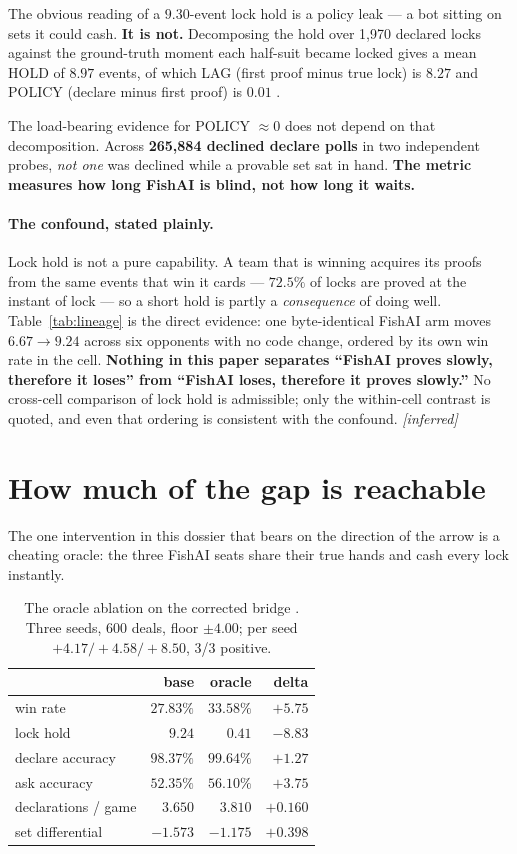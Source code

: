 \documentclass[11pt]{article}
\begin{document}
The obvious reading of a $9.30$-event lock hold is a policy leak --- a bot sitting on sets it could
cash. \textbf{It is not.} Decomposing the hold over 1{,}970 declared locks against the ground-truth
moment each half-suit became locked gives a mean HOLD of $8.97$ events, of which LAG (first proof
minus true lock) is $8.27$ and POLICY (declare minus first proof) is $\mathbf{0.01}$ \cite{loses}.

The load-bearing evidence for POLICY ${\approx}0$ does not depend on that decomposition. Across
\textbf{265{,}884 declined declare polls} in two independent probes, \emph{not one} was declined
while a provable set sat in hand. \textbf{The metric measures how long FishAI is blind, not how long
it waits.}

\paragraph{The confound, stated plainly.} Lock hold is not a pure capability. A team that is winning
acquires its proofs from the same events that win it cards --- $72.5\%$ of locks are proved at the
instant of lock --- so a short hold is partly a \emph{consequence} of doing well.
Table~\ref{tab:lineage} is the direct evidence: one byte-identical FishAI arm moves $6.67 \to 9.24$
across six opponents with no code change, ordered by its own win rate in the cell. \textbf{Nothing
in this paper separates ``FishAI proves slowly, therefore it loses'' from ``FishAI loses, therefore
it proves slowly.''} No cross-cell comparison of lock hold is admissible; only the within-cell
contrast is quoted, and even that ordering is consistent with the confound. \emph{[inferred]}

\section{How much of the gap is reachable}
\label{sec:residual}

The one intervention in this dossier that bears on the direction of the arrow is a cheating oracle:
the three FishAI seats share their true hands and cash every lock instantly.

\begin{table}[t]
\centering
\caption{The oracle ablation on the corrected bridge \cite{loses}. Three seeds, 600 deals, floor
$\pm 4.00$; per seed $+4.17 / +4.58 / +8.50$, 3/3 positive.}
\label{tab:oracle}
\footnotesize
\begin{tabular}{@{}lrrr@{}}
\toprule
 & base & oracle & delta \\
\midrule
win rate & $27.83\%$ & $\mathbf{33.58\%}$ & $\mathbf{+5.75}$ \\
lock hold & $9.24$ & $\mathbf{0.41}$ & $-8.83$ \\
declare accuracy & $98.37\%$ & $99.64\%$ & $+1.27$ \\
ask accuracy & $52.35\%$ & $56.10\%$ & $+3.75$ \\
declarations / game & $3.650$ & $3.810$ & $+0.160$ \\
set differential & $-1.573$ & $-1.175$ & $+0.398$ \\
\bottomrule
\end{tabular}
\end{table}
\end{document}
